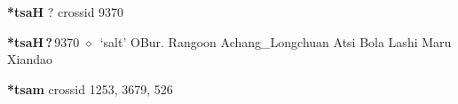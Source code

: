 \item
\textbf{*tsaH}
?
  {\tiny crossid 9370}
  \begin{list}{}{\leftmargin=1.5em \itemindent=-1.5em}
  \item {\footnotesize \textbf{*tsaH\,?\,}}{\tiny 9370}
         $\diamond$~`salt'
         OBur. 
\hspace{1ex}
         Rangoon 
\hspace{1ex}
         Achang\_Longchuan 
\hspace{1ex}
         Atsi 
\hspace{1ex}
         Bola 
\hspace{1ex}
         Lashi 
\hspace{1ex}
         Maru 
\hspace{1ex}
         Xiandao 
  \end{list}
\item
\textbf{*tsam}
  {\tiny crossid 1253, 3679, 526}
